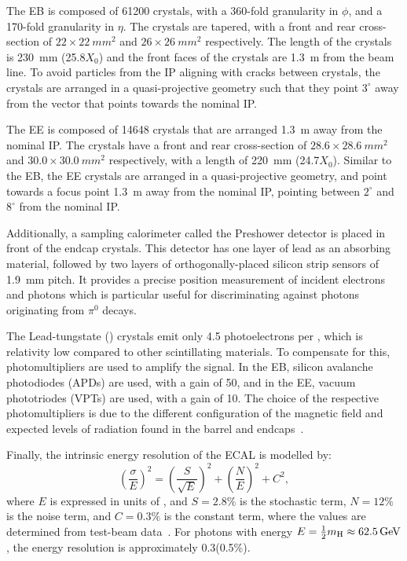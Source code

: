 The EB is composed of 61200 crystals, with a 360-fold granularity in $\phi$, and a 170-fold granularity in $\eta$. The crystals are tapered, with a front and rear cross-section of $22 \times 22~\unit{mm^2}$ and $26 \times 26~\unit{mm^2}$ respectively. The length of the crystals is 230~\unit{mm} (25.8$X_0$) and the front faces of the crystals are 1.3~\unit{m} from the beam line. To avoid particles from the IP aligning with cracks between crystals, the crystals are arranged in a quasi-projective geometry such that they point $3^{\circ}$ away from the vector that points towards the nominal IP. 

The EE is composed of 14648 crystals that are arranged 1.3~\unit{m} away from the nominal IP. The crystals have a front and rear cross-section of $28.6 \times 28.6~\unit{mm^2}$ and $30.0 \times 30.0~\unit{mm^2}$ respectively, with a length of 220~\unit{mm} (24.7$X_0$). Similar to the EB, the EE crystals are arranged in a quasi-projective geometry, and point towards a focus point 1.3~\unit{m} away from the nominal IP, pointing between $2^{\circ}$ and $8^{\circ}$ from the nominal IP. 

Additionally, a sampling calorimeter called the Preshower detector is placed in front of the endcap crystals. This detector has one layer of lead as an absorbing material, followed by two layers of orthogonally-placed silicon strip sensors of 1.9~\unit{mm} pitch. It provides a precise position measurement of incident electrons and photons which is particular useful for discriminating against photons originating from $\pi^0$ decays.

The Lead-tungstate (\pbw) crystals emit only 4.5 photoelectrons per \MeV, which is relativity low compared to other scintillating materials. To compensate for this, photomultipliers are used to amplify the signal. In the EB, silicon avalanche photodiodes (APDs) are used, with a gain of 50, and in the EE, vacuum phototriodes (VPTs) are used, with a gain of 10. The choice of the respective photomultipliers is due to the different configuration of the magnetic field and expected levels of radiation found in the barrel and endcaps~\cite{CMS:2008xjf}.

Finally, the intrinsic energy resolution of the ECAL is modelled by:
\begin{equation}
  \left(\frac{\sigma}{E}\right)^2 = \left(\frac{S}{\sqrt{E}}\right)^2 + \left(\frac{N}{E}\right)^2 + C^2,
\end{equation}
where $E$ is expressed in units of \GeV, and $S = 2.8\%$ is the stochastic term, $N = 12\%$ is the noise term, and $C = 0.3\%$ is the constant term, where the values are determined from test-beam data~\cite{CMS:2008xjf}. For photons with energy $E = \frac{1}{2}m_{\mathrm{H}} \approx 62.5\,\text{Ge\hspace{-.08em}V}$, the energy resolution is approximately 0.3\GeV (0.5\%).